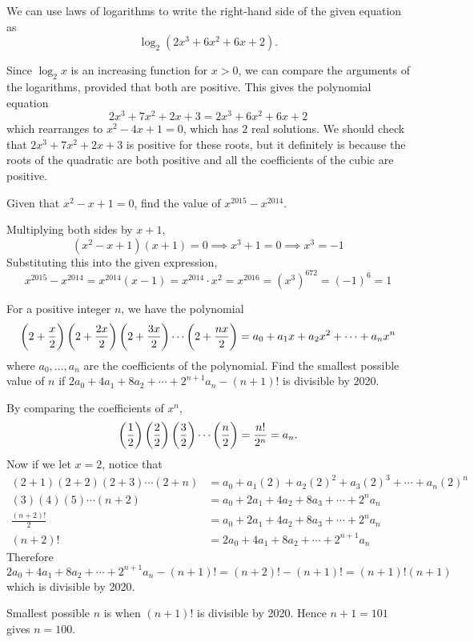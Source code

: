 \begin{solution}
We can use laws of logarithms to write the right-hand side of the given equation as
\[ \log_2 (2x^3+6x^2+6x+2). \]

Since $\log_2x$ is an increasing function for $x > 0$, we can compare the arguments of the logarithms, provided that both are positive. This gives the polynomial equation
\[ 2x^3+7x^2+2x+3=2x^3+6x^2+6x+2 \]
which rearranges to $x^2-4x+1=0$, which has $\boxed{2}$ real solutions. We should check that $2x^3+7x^2+2x+3$ is positive for these roots, but it definitely is because the roots of the quadratic are both positive and all the coefficients of the cubic are positive.
\end{solution}
\pagebreak

\begin{prbm}[CHINA 1979]
Given that $x^2-x+1=0$, find the value of $x^{2015}-x^{2014}$. 
\end{prbm}

\begin{solution}
Multiplying both sides by $x+1$,
\[ (x^2-x+1)(x+1)=0 \implies x^3+1=0 \implies x^3=-1 \]
Substituting this into the given expression,
\[ x^{2015} - x^{2014}=x^{2014} (x-1)=x^{2014} \cdot x^2=x^{2016}=(x^3)^{672}=(-1)^6=\boxed{1} \]
\end{solution}
\pagebreak

\begin{prbm}[DOKA]
For a positive integer $n$, we have the polynomial
\[ \left(2+\frac{x}{2}\right)\left(2+\frac{2x}{2}\right)\left(2+\frac{3x}{2}\right)\cdots\left(2+\frac{nx}{2}\right)=a_0+a_1x+a_2x^2+\cdots+a_nx^n \]
where $a_0,\dots,a_n$ are the coefficients of the polynomial. Find the smallest possible value of $n$ if $2a_0+4a_1+8a_2+\cdots+2^{n+1}a_n-(n+1)!$ is divisible by 2020.
\end{prbm}

\begin{solution}
By comparing the coefficients of $x^n$,
\[ \left(\frac{1}{2}\right)\left(\frac{2}{2}\right)\left(\frac{3}{2}\right)\cdots\left(\frac{n}{2}\right)=\frac{n!}{2^n}=a_n. \]
Now if we let $x=2$, notice that
\begin{align*}
(2+1)(2+2)(2+3)\cdots(2+n) &= a_0+a_1(2)+a_2(2)^2+a_3(2)^3+\cdots+a_n(2)^n \\
(3)(4)(5)\cdots(n+2) &= a_0+2a_1+4a_2+8a_3+\cdots+2^na_n \\
\frac{(n+2)!}{2} &= a_0+2a_1+4a_2+8a_3+\cdots+2^na_n \\
(n+2)! &= 2a_0+4a_1+8a_2+\cdots+2^{n+1}a_n
\end{align*}
Therefore
\[ 2a_0+4a_1+8a_2+\cdots+2^{n+1}a_n-(n+1)!=(n+2)!-(n+1)!=(n+1)!(n+1) \]
which is divisible by 2020.

Smallest possible $n$ is when $(n+1)!$ is divisible by 2020. 
Hence $n+1=101$ gives $\boxed{n=100}$.
\end{solution}
\pagebreak

